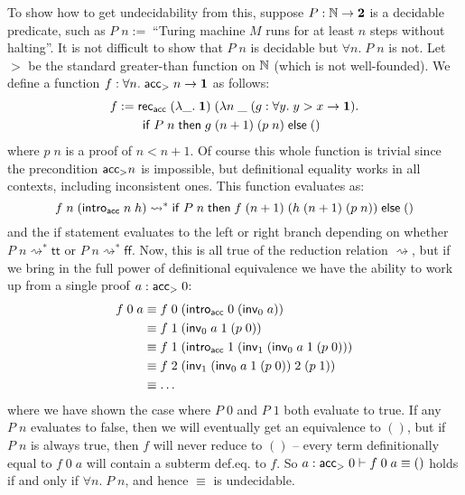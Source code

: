 To show how to get undecidability from this, suppose $P:\mathbb{N}\to\bf 2$ is a decidable predicate, such as $P\;n:=\;$``Turing machine $M$ runs for at least $n$ steps without halting''. It is not difficult to show that $P\;n$ is decidable but $\forall n.\;P\;n$ is not. Let $>$ be the standard greater-than function on $\mathbb{N}$ (which is not well-founded). We define a function $f:\forall n.\;\mathsf{acc}_{>}\;n\to\bf 1$ as follows:
\begin{align*}
f&:=\mathsf{rec}_{\mathsf{acc}}\;(\lambda\_.\;{\bf 1})\;(\lambda n\;\_\;(g:\forall y.\;y>x\to{\bf 1}).\\
&\qquad\mathsf{if}\;P\;n\;\mathsf{then}\;g\;(n+1)\;(p\;n)\;\mathsf{else}\;()
\end{align*}
where $p\;n$ is a proof of $n<n+1$. Of course this whole function is trivial since the precondition $\mathsf{acc}_{>}n$ is impossible, but definitional equality works in all contexts, including inconsistent ones. This function evaluates as:
$$f\;n\;(\mathsf{intro}_{\mathsf{acc}}\;n\;h)\rightsquigarrow^*\mathsf{if}\;P\;n\;\mathsf{then}\;f\;(n+1)\;(h\;(n+1)\;(p\;n))\;\mathsf{else}\;()$$
and the \textsf{if} statement evaluates to the left or right branch depending on whether $P\;n\rightsquigarrow^*\mathsf{tt}$ or $P\;n\rightsquigarrow^*\mathsf{ff}$. Now, this is all true of the reduction relation $\rightsquigarrow$, but if we bring in the full power of definitional equivalence we have the ability to work up from a single proof $a:\mathsf{acc}_{>}\;0$:
\begin{align*}
f\;0\;a&\equiv f\;0\;(\mathsf{intro}_{\mathsf{acc}}\;0\;(\mathsf{inv}_0\;a))\\
&\equiv f\;1\;(\mathsf{inv}_0\;a\;1\;(p\;0))\\
&\equiv f\;1\;(\mathsf{intro}_{\mathsf{acc}}\;1\;(\mathsf{inv}_1\;(\mathsf{inv}_0\;a\;1\;(p\;0)))\\
&\equiv f\;2\;(\mathsf{inv}_1\;(\mathsf{inv}_0\;a\;1\;(p\;0))\;2\;(p\;1))\\
&\equiv\dots
\end{align*}
where we have shown the case where $P\;0$ and $P\;1$ both evaluate to true. If any $P\;n$ evaluates to false, then we will eventually get an equivalence to $()$, but if $P\;n$ is always true, then $f$ will never reduce to $()$ -- every term definitionally equal to $f\;0\;a$ will contain a subterm def.eq. to $f$. So $a:\mathsf{acc}_{>}\;0\vdash f\;0\;a\equiv()$ holds if and only if $\forall n.\;P\;n$, and hence $\equiv$ is undecidable.

